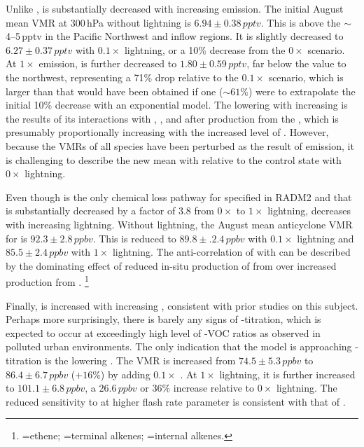 Unlike ,  is substantially decreased with increasing {\lnox} emission. The initial August mean VMR at 300\,\unit{hPa} without
lightning is $6.94\pm0.38\,\unit{pptv}$. This is above the $\sim$4--5\,\unit{pptv} in the Pacific Northwest and inflow regions. It is slightly decreased
to $6.27\pm0.37\,\unit{pptv}$ with $0.1\times$ lightning, or a 10\% decrease from the $0\times$ scenario. At $1\times$ {\lnox} emission, 
is further decreased to $1.80\pm0.59\,\unit{pptv}$, far below the value to the northwest, representing a 71\% drop relative to the $0.1\times$ scenario,
which is larger than that would have been obtained if one ($\sim61\%$) were to extrapolate the initial 10\% decrease with an exponential model.
The lowering  with increasing  is the results of its interactions with , , and  after production
from the , which is presumably proportionally increasing with the increased level of . However, because the VMRs
of all species have been perturbed as the result of {\lnox} emission, it is challenging to describe the new mean  with {\lnox} relative to
the control state with $0\times$ lightning.

Even though  is the only chemical loss pathway for  specified in RADM2 and that  is
substantially decreased by a factor of 3.8 from $0\times$ to $1\times$ lightning,  decreases with increasing lightning. Without lightning, the
August mean anticyclone VMR for  is $92.3\pm2.8\,\unit{ppbv}$. This is reduced to $89.8\pm.2.4\,\unit{ppbv}$ with $0.1\times$ lightning
and $85.5\pm2.4\,\unit{ppbv}$ with $1\times$ lightning. The anti-correlation of  with {\lnox} can be described by the dominating effect of
reduced in-situ production of  from  over increased production from .
\footnote{=ethene; =terminal alkenes; =internal alkenes.}

Finally,  is increased with increasing {\lnox}, consistent with prior studies on this subject. Perhaps more surprisingly, there is barely
any signs of -titration, which is expected to occur at exceedingly high level of -VOC ratios as observed in polluted urban
environments. The only indication that the model is approaching -titration is the lowering . The  VMR
is increased from $74.5\pm5.3\,\unit{ppbv}$ to $86.4\pm6.7\,\unit{ppbv}$ ($+16\%$) by adding $0.1\times$ {\lnox}. At $1\times$ lightning, it
is further increased to $101.1\pm6.8\,\unit{ppbv}$, a $26.6\,\unit{ppbv}$ or $36\%$ increase relative to $0\times$ lightning. The reduced sensitivity
to {\lnox} at higher flash rate parameter is consistent with that of .

